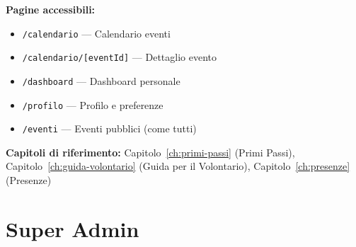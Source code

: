 \documentclass[a4paper,11pt,oneside]{book}
\newcommand{\percorso}[1]{\textcolor{namoCyan}{\texttt{#1}}}
\begin{document}
\begin{tcolorbox}
\vspace{0.5em}
\textbf{Pagine accessibili:}
\begin{itemize}[leftmargin=1.5em, topsep=2pt, itemsep=2pt]
  \item \percorso{/calendario} --- Calendario eventi
  \item \percorso{/calendario/[eventId]} --- Dettaglio evento
  \item \percorso{/dashboard} --- Dashboard personale
  \item \percorso{/profilo} --- Profilo e preferenze
  \item \percorso{/eventi} --- Eventi pubblici (come tutti)
\end{itemize}

\vspace{0.5em}
\textbf{Capitoli di riferimento:} Capitolo~\ref{ch:primi-passi} (Primi Passi), Capitolo~\ref{ch:guida-volontario} (Guida per il Volontario), Capitolo~\ref{ch:presenze} (Presenze)
\end{tcolorbox}

\section{Super Admin}
\label{sec:quick-superadmin}
\end{document}
